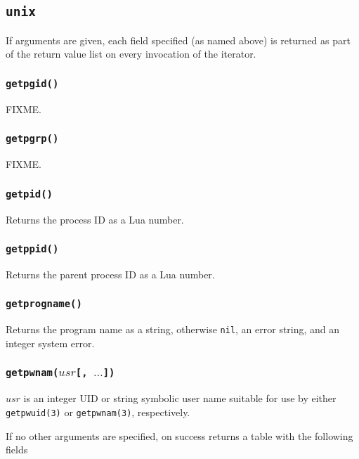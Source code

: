 \documentclass[11pt, oneside]{memoir}
\newcommand*{\nil}[0]{\texttt{nil}\xspace}
\newcommand*{\syscall}[1]{\texttt{#1}\xspace}
\newcommand*{\fn}[1]{\texttt{#1}\xspace}
\newcounter{toccols}
\newenvironment{Module}[1]{
	\subsection{\texttt{#1}}
	\addtocontents{toc}{
		\protect\begin{multicols}{\value{toccols}}
	}
}{
	\addtocontents{toc}{\protect\end{multicols}}
}
\begin{document}
\begin{Module}{unix}
If arguments are given, each field specified (as named above) is returned as part of the return value list on every invocation of the iterator.

\subsubsection[\fn{getpgid}]{\fn{getpgid()}}

FIXME.

\subsubsection[\fn{getpgrp}]{\fn{getpgrp()}}

FIXME.

\subsubsection[\fn{getpid}]{\fn{getpid()}}

Returns the process ID as a Lua number.

\subsubsection[\fn{getppid}]{\fn{getppid()}}

Returns the parent process ID as a Lua number.

\subsubsection[\fn{getprogname}]{\fn{getprogname()}}

Returns the program name as a string, otherwise \nil, an error string, and an integer system error.

\subsubsection[\fn{getpwnam}]{\fn{getpwnam($usr$[, $\ldots$])}}

$usr$ is an integer UID or string symbolic user name suitable for use by either \syscall{getpwuid(3)} or \syscall{getpwnam(3)}, respectively.

If no other arguments are specified, on success returns a table with the following fields


\end{Module}
\end{document}
